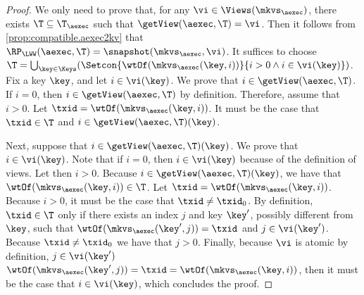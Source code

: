 \begin{proof}
We only need to prove that, for any $\vi \in \Views(\mkvs_{\aexec})$, there exists $\T \subseteq \T_{\aexec}$ such 
that $\getView(\aexec, \T) = \vi$. Then it follows from \cref{prop:compatible.aexec2kv} that 
$\RP_{\LWW}(\aexec, \T) = \snapshot(\mkvs_{\aexec}, \vi)$. 
It suffices to choose $\T = \bigcup_{\key \in \Keys}(\Setcon{ \wtOf(\mkvs_{\aexec}(\key, i)) }{ i > 0 
\wedge i \in \vi(\key)})$.
Fix a key $\key$, and let $i \in \vi(\key)$. We prove that $i \in \getView(\aexec, \T)$. 
If $i = 0$, then $i \in \getView(\aexec, \T)$ by definition. 
Therefore, assume that $i > 0$. Let $\txid = \wtOf(\mkvs_{\aexec}(\key, i))$.
It must be the case that $\txid \in \T$ and $i \in \getView(\aexec, \T)(\key)$.

Next, suppose that $i \in \getView(\aexec, \T)(\key)$. We prove that $i \in \vi(\key)$.
Note that if $i = 0$, then $i \in \vi(\key)$ because of the 
definition of views. Let then $i > 0$. Because $i \in \getView(\aexec, \T)(\key)$, we have that 
$\wtOf(\mkvs_{\aexec}(\key, i)) \in \T$.  Let $\txid = \wtOf(\mkvs_{\aexec}(\key, i))$. Because $i > 0$, 
it must be the case that $\txid \neq \txid_0$.
By definition, $\txid \in \T$ only if there 
exists an index $j$ and key $\key'$, possibly different from $\key$, such that $\wtOf(\mkvs_{\aexec}(\key', j)) = \txid$ and $j \in \vi(\key')$. 
Because $\txid \neq \txid_0$ we have that $j > 0$. Finally, because $\vi$ is atomic by definition, $j \in \vi(\key')$
$\wtOf(\mkvs_{\aexec}(\key', j)) = \txid = \wtOf(\mkvs_{\aexec}(\key, i))$, then it must be the case 
that $i \in \vi(\key)$, which concludes the proof.
\end{proof}

